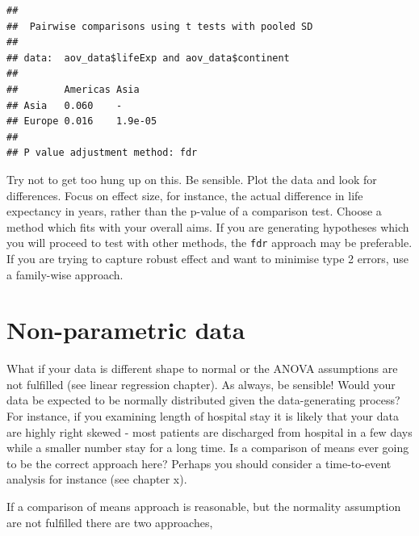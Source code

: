 \documentclass[12pt,]{krantz}
\makeatletter
\newenvironment{Shaded}{\begin{snugshade}}{\end{snugshade}}
\newcommand{\DataTypeTok}[1]{\textcolor[rgb]{0.13,0.29,0.53}{#1}}
\newcommand{\KeywordTok}[1]{\textcolor[rgb]{0.13,0.29,0.53}{\textbf{#1}}}
\newcommand{\NormalTok}[1]{#1}
\newcommand{\OperatorTok}[1]{\textcolor[rgb]{0.81,0.36,0.00}{\textbf{#1}}}
\newcommand{\StringTok}[1]{\textcolor[rgb]{0.31,0.60,0.02}{#1}}
\newenvironment{kframe}{%
\medskip{}
\setlength{\fboxsep}{.8em}
 \def\at@end@of@kframe{}%
 \ifinner\ifhmode%
  \def\at@end@of@kframe{\end{minipage}}%
  \begin{minipage}{\columnwidth}%
 \fi\fi%
 \def\FrameCommand##1{\hskip\@totalleftmargin \hskip-\fboxsep
 \colorbox{shadecolor}{##1}\hskip-\fboxsep
     \hskip-\linewidth \hskip-\@totalleftmargin \hskip\columnwidth}%
 \MakeFramed {\advance\hsize-\width
   \@totalleftmargin\z@ \linewidth\hsize
   \@setminipage}}%
 {\par\unskip\endMakeFramed%
 \at@end@of@kframe}
\renewenvironment{Shaded}{\begin{kframe}}{\end{kframe}}
\theoremstyle{definition}
\theoremstyle{definition}
\theoremstyle{definition}
\theoremstyle{remark}
\makeatother
\begin{document}
\begin{Shaded}
\end{Shaded}

\begin{verbatim}
## 
##  Pairwise comparisons using t tests with pooled SD 
## 
## data:  aov_data$lifeExp and aov_data$continent 
## 
##        Americas Asia   
## Asia   0.060    -      
## Europe 0.016    1.9e-05
## 
## P value adjustment method: fdr
\end{verbatim}


Try not to get too hung up on this. Be sensible. Plot the data and look
for differences. Focus on effect size, for instance, the actual
difference in life expectancy in years, rather than the p-value of a
comparison test. Choose a method which fits with your overall aims. If
you are generating hypotheses which you will proceed to test with other
methods, the \texttt{fdr} approach may be preferable. If you are trying
to capture robust effect and want to minimise type 2 errors, use a
family-wise approach.

\hypertarget{non-parametric-data}{%
\section{Non-parametric data}\label{non-parametric-data}}


What if your data is different shape to normal or the ANOVA assumptions
are not fulfilled (see linear regression chapter). As always, be
sensible! Would your data be expected to be normally distributed given
the data-generating process? For instance, if you examining length of
hospital stay it is likely that your data are highly right skewed - most
patients are discharged from hospital in a few days while a smaller
number stay for a long time. Is a comparison of means ever going to be
the correct approach here? Perhaps you should consider a time-to-event
analysis for instance (see chapter x).

If a comparison of means approach is reasonable, but the normality
assumption are not fulfilled there are two approaches,
\end{document}
